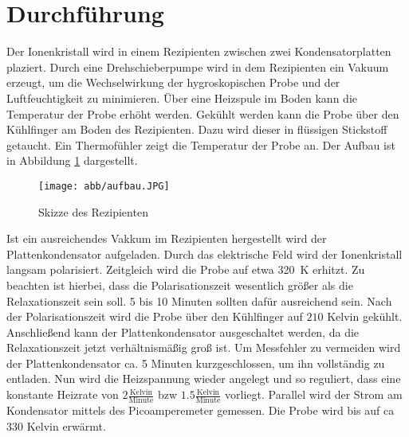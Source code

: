 \section{Durchführung}
\label{sec:Durchführung}

Der Ionenkristall wird in einem Rezipienten zwischen zwei Kondensatorplatten plaziert.
Durch eine Drehschieberpumpe wird in dem Rezipienten ein Vakuum erzeugt,
um die Wechselwirkung der hygroskopischen Probe und der Luftfeuchtigkeit zu minimieren.
Über eine Heizspule im Boden kann die Temperatur der Probe erhöht werden.
Gekühlt werden kann die Probe über den Kühlfinger am Boden des Rezipienten.
Dazu wird dieser in flüssigen Stickstoff getaucht.
Ein Thermofühler zeigt die Temperatur der Probe an.
Der Aufbau ist in Abbildung \ref{abb:aufbau} dargestellt.
\begin{figure}[h] 
    \centering
    \texttt{[image: abb/aufbau.JPG]}
    \caption{Skizze des Rezipienten \cite{sample}}
    \label{abb:aufbau}
\end{figure}
Ist ein ausreichendes Vakkum im Rezipienten hergestellt wird der Plattenkondensator aufgeladen.
Durch das elektrische Feld wird der Ionenkristall langsam polarisiert. Zeitgleich wird die
Probe auf etwa \SI{320}{\kelvin} erhitzt.
Zu beachten ist hierbei, dass die Polarisationszeit wesentlich größer als die Relaxationszeit sein soll.
5 bis 10 Minuten sollten dafür ausreichend sein.
Nach der Polarisationszeit wird die Probe über den Kühlfinger auf $210$ Kelvin gekühlt.
Anschließend kann der Plattenkondensator ausgeschaltet werden,
da die Relaxationszeit jetzt verhältnismäßig groß ist.
Um Messfehler zu vermeiden wird der Plattenkondensator ca. 5 Minuten kurzgeschlossen, 
um ihn vollständig zu entladen.
Nun wird die Heizspannung wieder angelegt und so reguliert,
dass eine konstante Heizrate von $2 \frac{\text{Kelvin}}{\text{Minute}}$ bzw $1.5 \frac{\text{Kelvin}}{\text{Minute}}$ vorliegt.
Parallel wird der Strom am Kondensator mittels des Picoamperemeter gemessen.
Die Probe wird bis auf ca $330$ Kelvin erwärmt.
